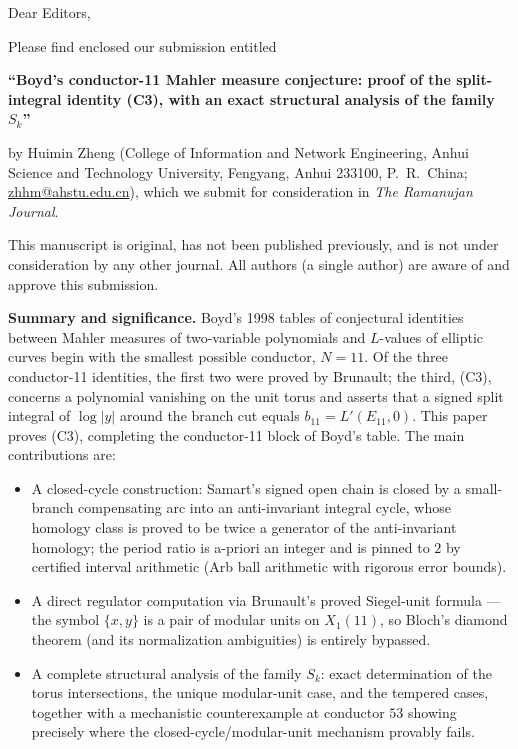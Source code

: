 \documentclass[11pt]{article}
\begin{document}
\thispagestyle{empty}

Dear Editors,

Please find enclosed our submission entitled

\begin{center}
\textbf{``Boyd's conductor-11 Mahler measure conjecture: proof of the
split-integral identity (C3), with an exact structural analysis of the
family $S_k$''}
\end{center}

by Huimin Zheng (College of Information and Network Engineering, Anhui
Science and Technology University, Fengyang, Anhui 233100, P.~R.~China;
\url{zhhm@ahstu.edu.cn}), which we submit for consideration in
\emph{The Ramanujan Journal}.

This manuscript is original, has not been published previously, and is
not under consideration by any other journal. All authors (a single
author) are aware of and approve this submission.

\textbf{Summary and significance.} Boyd's 1998 tables of conjectural
identities between Mahler measures of two-variable polynomials and
$L$-values of elliptic curves begin with the smallest possible
conductor, $N=11$. Of the three conductor-11 identities, the first two
were proved by Brunault; the third, (C3), concerns a polynomial
vanishing on the unit torus and asserts that a signed split integral of
$\log|y|$ around the branch cut equals $b_{11}=L'(E_{11},0)$. This
paper proves (C3), completing the conductor-11 block of Boyd's table.
The main contributions are:
\begin{itemize}
\item A closed-cycle construction: Samart's signed open chain is closed
by a small-branch compensating arc into an anti-invariant integral
cycle, whose homology class is proved to be twice a generator of the
anti-invariant homology; the period ratio is a-priori an integer and
is pinned to $2$ by certified interval arithmetic (Arb ball arithmetic
with rigorous error bounds).
\item A direct regulator computation via Brunault's proved Siegel-unit
formula --- the symbol $\{x,y\}$ is a pair of modular units on
$X_1(11)$, so Bloch's diamond theorem (and its normalization
ambiguities) is entirely bypassed.
\item A complete structural analysis of the family $S_k$: exact
determination of the torus intersections, the unique modular-unit
case, and the tempered cases, together with a mechanistic
counterexample at conductor $53$ showing precisely where the
closed-cycle/modular-unit mechanism provably fails.
\end{itemize}
\end{document}
